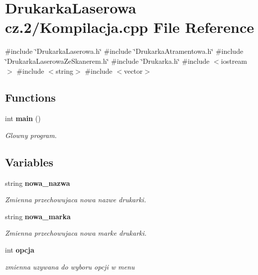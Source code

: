 \section{Drukarka\+Laserowa cz.2/\+Kompilacja.cpp File Reference}
\label{_kompilacja_8cpp}
{\ttfamily \#include \char`\"{}Drukarka\+Laserowa.\+h\char`\"{}}\newline
{\ttfamily \#include \char`\"{}Drukarka\+Atramentowa.\+h\char`\"{}}\newline
{\ttfamily \#include \char`\"{}Drukarka\+Laserowa\+Ze\+Skanerem.\+h\char`\"{}}\newline
{\ttfamily \#include \char`\"{}Drukarka.\+h\char`\"{}}\newline
{\ttfamily \#include $<$iostream$>$}\newline
{\ttfamily \#include $<$string$>$}\newline
{\ttfamily \#include $<$vector$>$}\newline
\subsection*{Functions}
\begin{DoxyCompactItemize}
\item 
int \textbf{ main} ()
\begin{DoxyCompactList}\small\item\em Glowny program. \end{DoxyCompactList}\end{DoxyCompactItemize}
\subsection*{Variables}
\begin{DoxyCompactItemize}
\item 
string \textbf{ nowa\+\_\+nazwa}
\begin{DoxyCompactList}\small\item\em Zmienna przechowujaca nowa nazwe drukarki. \end{DoxyCompactList}\item 
string \textbf{ nowa\+\_\+marka}
\begin{DoxyCompactList}\small\item\em Zmienna przechowujaca nowa marke drukarki. \end{DoxyCompactList}\item 
int \textbf{ opcja}
\begin{DoxyCompactList}\small\item\em zmienna uzywana do wyboru opcji w menu \end{DoxyCompactList}\end{DoxyCompactItemize}


